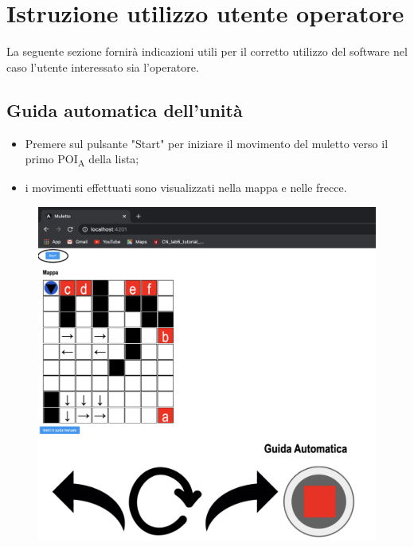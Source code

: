 \section{Istruzione utilizzo utente operatore}

La seguente sezione fornirà indicazioni utili per il corretto utilizzo del software nel caso l'utente interessato sia l'operatore.
\subsection{Guida automatica dell'unità}
\begin{itemize}
    \item Premere sul pulsante "Start" per iniziare il movimento del muletto verso il primo POI\textsubscript{A} della lista;
    \item i movimenti effettuati sono visualizzati nella mappa e nelle frecce.
    
\end{itemize}
\begin{figure}[H]
    \centering
    \includegraphics[scale=0.4]{res/images/forklift_start.png}
\end{figure}

